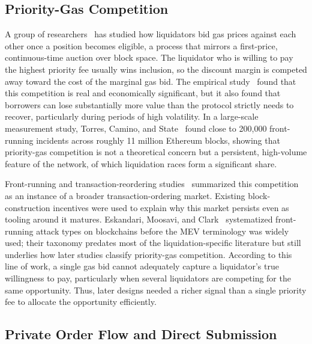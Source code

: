 \documentclass[conference]{IEEEtran}
\begin{document}
\subsection{Priority-Gas Competition}

A group of researchers~\cite{qin2021empirical} has studied how
liquidators bid gas prices against each other once a position becomes
eligible, a process that mirrors a first-price, continuous-time auction
over block space. The liquidator who is willing to pay the highest
priority fee usually wins inclusion, so the discount margin is
competed away toward the cost of the marginal gas bid. The empirical
study~\cite{qin2021empirical} found that this competition is real and
economically significant, but it also found that borrowers can lose
substantially more value than the protocol strictly needs to recover,
particularly during periods of high volatility. In a large-scale
measurement study, Torres, Camino, and State~\cite{torres2021frontrunner}
found close to 200{,}000 front-running incidents across roughly 11
million Ethereum blocks, showing that priority-gas competition is not a
theoretical concern but a persistent, high-volume feature of the
network, of which liquidation races form a significant share.

Front-running and transaction-reordering studies~\cite{daian2019flash}
summarized this competition as an instance of a broader
transaction-ordering market. Existing block-construction incentives
were used to explain why this market persists even as tooling around it
matures. Eskandari, Moosavi, and Clark~\cite{eskandari2019sok}
systematized front-running attack types on blockchains before the MEV
terminology was widely used; their taxonomy predates most of the
liquidation-specific literature but still underlies how later studies
classify priority-gas competition. According to this line of work, a
single gas bid cannot adequately capture a liquidator's true willingness
to pay, particularly when several liquidators are competing for the
same opportunity. Thus, later designs needed a richer signal than a
single priority fee to allocate the opportunity efficiently.

\subsection{Private Order Flow and Direct Submission}
\end{document}
